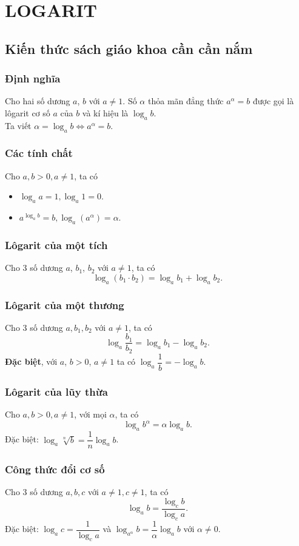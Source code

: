 \setcounter{section}{1}
\section{LOGARIT}
\subsection{Kiến thức sách giáo khoa cần cần nắm}
\subsubsection{Định nghĩa}
Cho hai số dương $a$, $b$ với $a\neq 1$. Số $\alpha$ thỏa mãn đẳng thức $a^{\alpha}=b$ được gọi là lôgarit cơ số $a$ của $b$ và kí hiệu là $\log_ab$.\\
Ta viết $\alpha=\log_ab\Leftrightarrow a^{\alpha}=b$.
\subsubsection{Các tính chất}
Cho $a, b>0, a\neq 1$, ta có
\begin{itemize}
	\item $\log_aa=1,\log_a1=0$.
	\item $a^{\log_ab}=b,\log_a(a^{\alpha})=\alpha$.
\end{itemize}
\subsubsection{Lôgarit của một tích}
Cho 3 số dương $a$, $b_1$, $b_2$ với $a\neq 1$, ta có 
$$\log_a(b_1\cdot b_2)=\log_ab_1+\log_ab_2.$$
\subsubsection{Lôgarit của một thương}
Cho 3 số dương $a, b_1, b_2$ với $a\neq 1$, ta có
$$\log_a\dfrac{b_1}{b_2}=\log_ab_1-\log_ab_2.$$
\textbf{Đặc biệt}, với $a$, $b>0$, $a\neq 1$ ta có $\log_a\dfrac{1}{b}=-\log_ab$.
\subsubsection{Lôgarit của lũy thừa}
Cho $a, b>0, a\neq 1$, với mọi $\alpha$, ta có
$$\log_ab^{\alpha}=\alpha\log_ab.$$
Đặc biệt: $\log_a\sqrt[n]{b}=\dfrac{1}{n}\log_ab$.
\subsubsection{Công thức đổi cơ số}
Cho 3 số dương $a, b, c$ với $a\neq 1,c\neq 1$, ta có
$$\log_ab=\dfrac{\log_cb}{\log_ca}.$$
Đặc biệt: $\log_ac=\dfrac{1}{\log_ca}$ và $\log_{a^{\alpha}}b=\dfrac{1}{\alpha}\log_ab$ với $\alpha\neq 0$.\\
